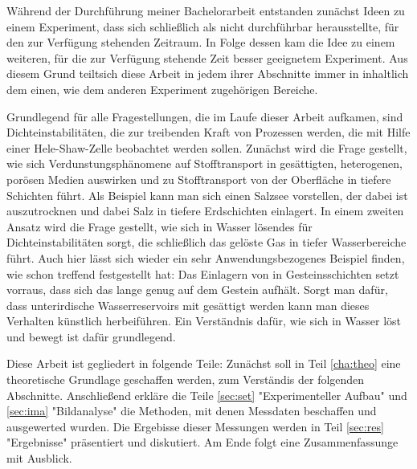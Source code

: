 
\label{cha:intro}

Während der Durchführung meiner Bachelorarbeit entstanden zunächst Ideen zu einem Experiment, dass sich schließlich als nicht durchführbar herausstellte, für den zur Verfügung stehenden Zeitraum. In Folge dessen kam die Idee zu einem weiteren, für die zur Verfügung stehende Zeit besser geeignetem Experiment. Aus diesem Grund teiltsich diese Arbeit in jedem ihrer Abschnitte immer in inhaltlich dem einen, wie dem anderen Experiment zugehörigen Bereiche.

Grundlegend für alle Fragestellungen, die im Laufe dieser Arbeit aufkamen, sind Dichteinstabilitäten, die zur treibenden Kraft von Prozessen werden, die mit Hilfe einer Hele-Shaw-Zelle beobachtet werden sollen.
Zunächst wird die Frage gestellt, wie sich Verdunstungsphänomene auf Stofftransport in gesättigten, heterogenen, porösen Medien auswirken und zu Stofftransport von der Oberfläche in tiefere Schichten führt. Als Beispiel kann man sich einen Salzsee vorstellen, der dabei ist auszutrocknen und dabei Salz in tiefere Erdschichten einlagert.
In einem zweiten Ansatz wird die Frage gestellt, wie sich in Wasser lösendes \COT für Dichteinstabilitäten sorgt, die schließlich das gelöste Gas in tiefer Wasserbereiche führt. Auch hier lässt sich wieder ein sehr Anwendungsbezogenes Beispiel finden, wie schon \cite{fernandez} treffend festgestellt hat: Das Einlagern von \COT in Gesteinsschichten setzt vorraus, dass sich das \COT lange genug auf dem Gestein aufhält. Sorgt man dafür, dass unterirdische Wasserreservoirs mit \COT gesättigt werden kann man dieses Verhalten künstlich herbeiführen. Ein Verständnis dafür, wie sich \COT in Wasser löst und bewegt ist dafür grundlegend.

Diese Arbeit ist gegliedert in folgende Teile: Zunächst soll in Teil \ref{cha:theo} eine theoretische Grundlage geschaffen werden, zum Verständis der folgenden Abschnitte. Anschließend erkläre die Teile \ref{sec:set} "Experimenteller Aufbau" und \ref{sec:ima} "Bildanalyse" die Methoden, mit denen Messdaten beschaffen und ausgewerted wurden. Die Ergebisse dieser Messungen werden in Teil \ref{sec:res} "Ergebnisse" präsentiert und diskutiert. 
Am Ende folgt eine Zusammenfassunge mit Ausblick.